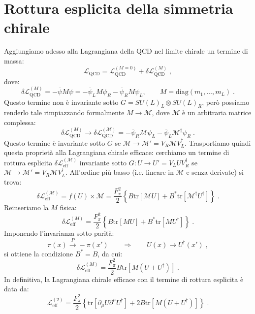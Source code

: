 \documentclass[12pt,a4paper]{article}
\theoremstyle{definition}
\newcommand{\lag}{\mathcal{L}}
\newcommand{\adj}[1]{#1^{\dagger}}
\newcommand{\tr}{\mathrm{tr}}
\numberwithin{equation}{section}
\begin{document}
\section{Rottura esplicita della simmetria chirale}
Aggiungiamo adesso alla Lagrangiana della QCD nel limite chirale un termine di massa:
\begin{equation}
\lag_{\mathrm{QCD}}=\lag_{\mathrm{QCD}}^{(M=0)}+\delta\lag_{\mathrm{QCD}}^{(M)}\;,
\end{equation}
dove:
\begin{equation}
\delta\lag_{\mathrm{QCD}}^{(M)}=-\overline{\psi}M\psi=-\overline{\psi}_LM\psi_R-\overline{\psi}_RM\psi_L,\qquad M=\mathrm{diag}(m_1,\ldots,m_L)\;.
\end{equation}
Questo termine non è invariante sotto $G=SU(L)_L\otimes SU(L)_R$, però possiamo renderlo tale rimpiazzando formalmente $M\to\mathcal{M}$, dove $\mathcal{M}$ è un arbitraria matrice complessa:
$$
\delta\lag_{\mathrm{QCD}}^{(M)}\to\delta\lag_{\mathrm{QCD}}^{(\mathcal{M})}=-\overline{\psi}_R\mathcal{M}\psi_L-\overline{\psi}_L\adj{\mathcal{M}}\psi_R\;.
$$
Questo termine è invariante sotto $G$ se $\mathcal{M}\to \mathcal{M}'=V_R\mathcal{M}\adj{V}_L$. Trasportiamo quindi questa proprietà alla Lagrangiana chirale efficace: cerchiamo un termine di rottura esplicita $\delta\lag_{\mathrm{eff}}^{(\mathcal{M})}$ invariante sotto $G:U\to U'=V_LU\adj{V}_R$ se $\mathcal{M}\to\mathcal{M}'=V_R\mathcal{M}\adj{V}_L$. All'ordine più basso (i.e. lineare in $\mathcal{M}$ e senza derivate) si trova:
\begin{equation}
\delta\lag_{\mathrm{eff}}^{(\mathcal{M})}=f(U)\times\mathcal{M}=\frac{F_{\pi}^2}{2}\left\{B\tr[\mathcal{M}U]+B^*\tr[\adj{\mathcal{M}}\adj{U}]\right\}\;.
\end{equation}
Reinseriamo la $M$ fisica:
\begin{equation}
\delta\lag_{\mathrm{eff}}^{(M)}=\frac{F_{\pi}^2}{2}\left\{B\tr[MU]+B^*\tr[M\adj{U}]\right\}\;.
\end{equation}
Imponendo l'invarianza sotto parità:
$$
\pi(x)\stackrel{P}{\longrightarrow}-\pi(x') \qquad \Longrightarrow\qquad U(x)\to \adj{U}(x')\;,
$$
si ottiene la condizione $B^*=B$, da cui:
\begin{equation}
\delta\lag_{\mathrm{eff}}^{(M)}=\frac{F_{\pi}^2}{2}B\tr[M(U+\adj{U})]\;.
\end{equation}
In definitiva, la Lagrangiana chirale efficace con il termine di rottura esplicita è data da:
\begin{equation}
\boxed{
\lag_{\mathrm{eff}}^{(2)}=\frac{F_{\pi}^2}{2}\left\{\tr[\partial_{\mu}U\partial^{\mu}\adj{U}]+2B\tr[M(U+\adj{U})]\right\}
}\;.
\end{equation}
\end{document}
